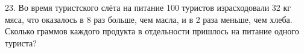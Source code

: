 23. Во время туристского слёта на питание 100 туристов израсходовали 32 кг мяса, что оказалось в 8 раз больше, чем масла, и в 2 раза меньше, чем хлеба. Сколько граммов каждого продукта в отдельности пришлось на питание одного туриста?\\
